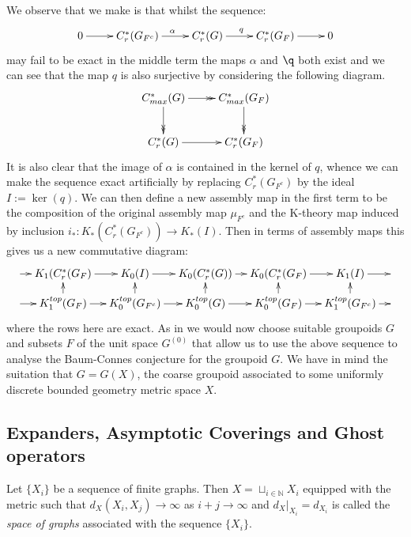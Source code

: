 We observe that we make is that whilst the sequence:
\begin{equation*}
\xymatrix{
0 \ar[r] & C_{r}^{*}(G_{F^{c}}) \ar[r]^{\alpha}& C_{r}^{*}(G) \ar[r]^{q} & C_{r}^{*}(G_{F}) \ar[r] & 0
}
\end{equation*}
may fail to be exact in the middle term the maps $\alpha$ and $\q$ both exist and we can see that the map $q$ is also surjective by considering the following diagram.
\begin{equation*}
\xymatrix{C^{*}_{max}(G) \ar@{->>}[r] \ar@{->>}[d] & C^{*}_{max}(G_{F}) \ar@{->>}[d]\\
C^{*}_{r}(G)\ar@{->}[r] &   C^{*}_{r}(G_{F})
}
\end{equation*}
It is also clear that the image of $\alpha$ is contained in the kernel of $q$, whence we can make the sequence exact artificially by replacing $C_{r}^{*}(G_{F^{c}})$ by the ideal $I:=\ker(q)$. We can then define a new assembly map in the first term to be the composition of the original assembly map $\mu_{F^{c}}$ and the K-theory map induced by inclusion $i_{*}:K_{*}(C^{*}_{r}(G_{F^{c}})) \rightarrow K_{*}(I)$. Then in terms of assembly maps this gives us a new commutative diagram:
\begin{equation*}\label{Fig:F1}
\xymatrix@=1em{
\ar[r] & K_{1}(C^{*}_{r}(G_{F}) \ar[r] & K_{0}(I) \ar[r]& K_{0}(C^{*}_{r}(G)) \ar[r]& K_{0}(C^{*}_{r}(G_{F})\ar[r] & K_{1}(I) \ar[r] & \\
\ar[r] & K_{1}^{top}(G_{F}) \ar[r] \ar[u]& K_{0}^{top}(G_{F^{c}}) \ar[r]\ar[u]& K_{0}^{top}(G) \ar[r]\ar[u]& K_{0}^{top}(G_{F}) \ar[r]\ar[u]& K_{1}^{top}(G_{F^{c}})\ar[u] \ar[r]& 
}
\end{equation*}
where the rows here are exact. 
As in \cite{MR1911663} we would now choose suitable groupoids $G$ and subsets $F$ of the unit space $G^{(0)}$ that allow us to use the above sequence to analyse the Baum-Connes conjecture for the groupoid $G$. We have in mind the suitation that $G=G(X)$, the coarse groupoid associated to some uniformly discrete bounded geometry metric space $X$.

\subsection{Expanders, Asymptotic Coverings and Ghost operators}\label{Sect:GO}

\begin{definition}
Let $\lbrace X_{i} \rbrace$ be a sequence of finite graphs. Then $X=\sqcup_{i\in\mathbb{N}}X_{i}$ equipped with the metric such that $d_{X}(X_{i},X_{j})\rightarrow \infty$ as $i+j\rightarrow \infty$ and $d_{X}|_{X_{i}}=d_{X_{i}}$ is called the \textit{space of graphs} associated with the sequence $\lbrace X_{i} \rbrace$. 
\end{definition}

